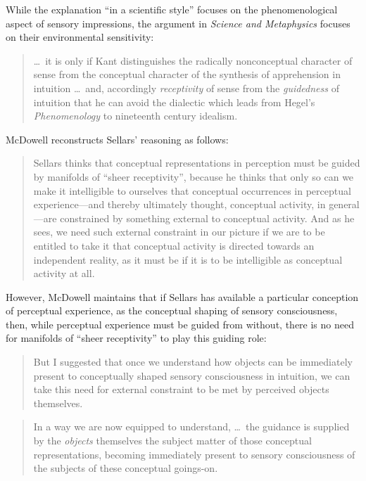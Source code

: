 \documentclass[12pt]{article}
\begin{document}
While the explanation ``in a scientific style'' focuses on the phenomenological aspect of sensory impressions, the argument in \emph{Science and Metaphysics} focuses on their environmental sensitivity:
\begin{quote}
    \ldots\ it is only if Kant distinguishes the radically nonconceptual character of sense from the conceptual character of the synthesis of apprehension in intuition \ldots\ and, accordingly \emph{receptivity} of sense from the \emph{guidedness} of intuition that he can avoid the dialectic which leads from Hegel's \emph{Phenomenology} to nineteenth century idealism. \citep[16]{Sellars:1967uq}
\end{quote}
McDowell reconstructs Sellars' reasoning as follows:
\begin{quote}
    Sellars thinks that conceptual representations in perception must be guided by manifolds of ``sheer receptivity'', because he thinks that only so can we make it intelligible to ourselves that conceptual occurrences in perceptual experience---and thereby ultimately thought, conceptual activity, in general---are constrained by something external to conceptual activity. And as he sees, we need such external constraint in our picture if we are to be entitled to take it that conceptual activity is directed towards an independent reality, as it must be if it is to be intelligible as conceptual activity at all. \citep[46]{McDowell:1998vn}
\end{quote}

However, McDowell maintains that if Sellars has available a particular conception of perceptual experience, as the conceptual shaping of sensory consciousness, then, while perceptual experience must be guided from without, there is no need for manifolds of ``sheer receptivity'' to play this guiding role:
\begin{quote}
    But I suggested that once we understand how objects can be immediately present to conceptually shaped sensory consciousness in intuition, we can take this need for external constraint to be met by perceived objects themselves. \citep[46]{McDowell:1998vn}
\end{quote}
\begin{quote}
    In a way we are now equipped to understand, \ldots\ the guidance is supplied by the \emph{objects} themselves the subject matter of those conceptual representations, becoming immediately present to sensory consciousness of the subjects of these conceptual goings-on. \citep[467]{McDowell:1998vn}
\end{quote}
\end{document}
